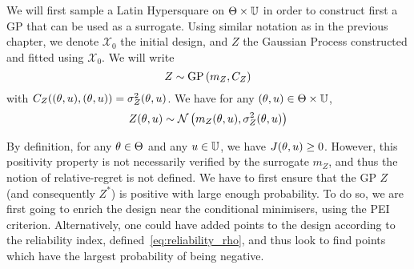\documentclass[../../Main_ManuscritThese.tex]{subfiles}
\begin{document}
We will first sample a Latin Hypersquare on
$\Theta \times \mathbb{U}$ in order to construct first a GP that can be
used as a surrogate. Using similar notation as in the previous
chapter, we denote $\mathcal{X}_0$ the initial design, and $Z$ the
Gaussian Process constructed and fitted using
$\mathcal{X}_0$.
We will write
\begin{equation}
  Z \sim \operatorname{\mathrm{GP}}\left(m_Z, C_Z\right)
\end{equation}
with $C_Z((\theta, u),(\theta, u)) = \sigma^2_Z(\theta, u)$. We have for
any $(\theta, u) \in \Theta\times\mathbb{U}$,
\begin{equation}
  Z(\theta, u) \sim \mathcal{N}\left(m_Z(\theta, u), \sigma^2_Z(\theta, u)\right)
\end{equation}


By definition, for any $\theta\in \Theta$ and any $u \in \mathbb{U}$, we
have $J(\theta, u) \geq 0$.  However, this positivity property is not
necessarily verified by the surrogate $m_Z$, and thus the notion of
relative-regret is not defined. We have to first ensure that the GP
$Z$ (and consequently $Z^*$) is positive with large enough
probability.  To do so, we are first going to enrich the design near
the conditional minimisers, using the PEI criterion.  Alternatively,
one could have added points to the design according to the reliability
index, defined~\cref{eq:reliability_rho}, and thus look to find points
which have the largest probability of being negative.
\end{document}
